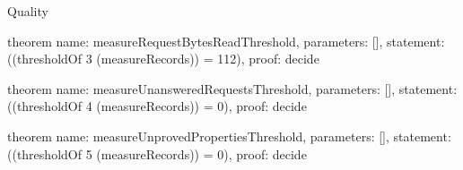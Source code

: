 \begin{lexlean}{Quality}
\begin{semanticmodule}
theorem{
  name: measureRequestBytesReadThreshold,
  parameters: [],
  statement: ((thresholdOf 3 (measureRecords)) = 112),
  proof: decide{}
}

theorem{
  name: measureUnansweredRequestsThreshold,
  parameters: [],
  statement: ((thresholdOf 4 (measureRecords)) = 0),
  proof: decide{}
}

theorem{
  name: measureUnprovedPropertiesThreshold,
  parameters: [],
  statement: ((thresholdOf 5 (measureRecords)) = 0),
  proof: decide{}
}
\end{semanticmodule}
\end{lexlean}
